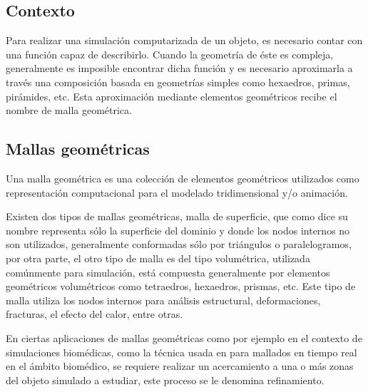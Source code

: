 
\subsection{Contexto}

Para realizar una simulación computarizada de un objeto, es necesario contar con una función capaz de describirlo. Cuando la geometría de éste es compleja, generalmente es imposible encontrar dicha función y es necesario aproximarla a través una composición basada en geometrías simples como hexaedros, primas, pirámides, etc. Esta aproximación mediante elementos geométricos recibe el nombre de malla geométrica.
\subsection{Mallas geométricas}

Una malla geométrica es una colección de elementos geométricos utilizados como representación computacional para el modelado tridimensional y/o animación.

Existen dos tipos de mallas geométricas, malla de superficie, que como dice su nombre representa sólo la superficie del dominio y donde los nodos internos no son utilizados, generalmente conformadas sólo por triángulos o paralelogramos, por otra parte, el otro tipo de malla es del tipo volumétrica, utilizada comúnmente para simulación, está compuesta generalmente por elementos geométricos volumétricos como tetraedros, hexaedros, prismas, etc. Este tipo de malla utiliza los nodos internos para análisis estructural, deformaciones, fracturas, el efecto del calor, entre otras.

En ciertas aplicaciones de mallas geométricas como por ejemplo en el contexto de simulaciones biomédicas, como la técnica usada en \cite{lobos2015mixed} para mallados en tiempo real en el ámbito biomédico, se requiere realizar un acercamiento a una o más zonas del objeto simulado a estudiar, este proceso se le denomina refinamiento.

